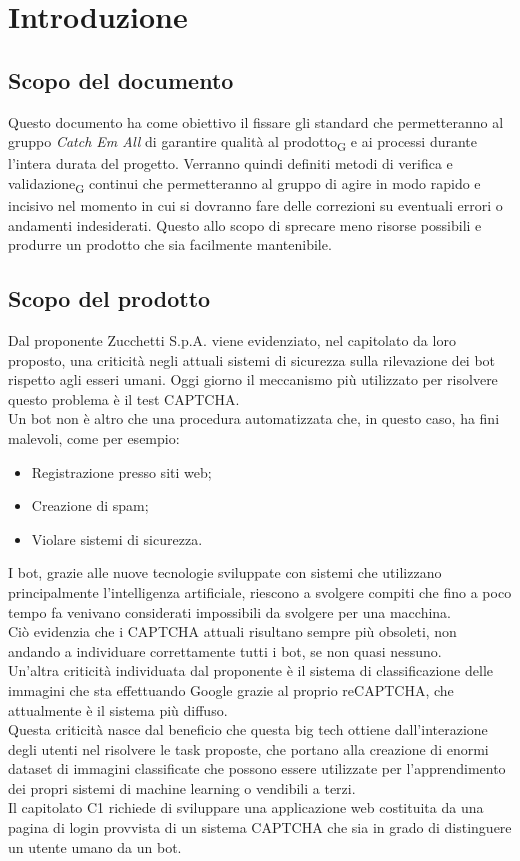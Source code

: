 \section{Introduzione}

\subsection{Scopo del documento}
Questo documento ha come obiettivo il fissare gli standard che permetteranno al gruppo \textit{Catch Em All} di garantire qualità al prodotto\textsubscript{G} e ai processi durante l'intera durata del progetto. Verranno quindi definiti metodi di verifica e validazione\textsubscript{G} continui che permetteranno al gruppo di agire in modo rapido e incisivo nel momento in cui si dovranno fare delle correzioni su eventuali errori o andamenti indesiderati. Questo allo scopo di sprecare meno risorse possibili e produrre un prodotto che sia facilmente mantenibile. 

\subsection{Scopo del prodotto}
Dal proponente Zucchetti S.p.A. viene evidenziato, nel capitolato da loro proposto, una criticità negli attuali sistemi di sicurezza sulla rilevazione dei bot rispetto agli esseri umani. Oggi giorno il meccanismo più utilizzato per risolvere questo problema è il test CAPTCHA.\\
Un bot non è altro che una procedura automatizzata che, in questo caso, ha fini malevoli, come per esempio:
\begin{itemize}
	\item Registrazione presso siti web;
	\item Creazione di spam;
	\item Violare sistemi di sicurezza.
\end{itemize}
I bot, grazie alle nuove tecnologie sviluppate con sistemi che utilizzano principalmente l'intelligenza artificiale, riescono a svolgere compiti che fino a poco tempo fa venivano considerati impossibili da svolgere per una macchina.\\
Ciò evidenzia che i CAPTCHA attuali risultano sempre più obsoleti, non andando a individuare correttamente tutti i bot, se non quasi nessuno.\\
Un'altra criticità individuata dal proponente è il sistema di classificazione delle immagini che sta effettuando Google grazie al proprio reCAPTCHA, che attualmente è il sistema più diffuso.\\
Questa criticità nasce dal beneficio che questa big tech ottiene dall'interazione degli utenti nel risolvere le task proposte, che portano alla creazione di enormi dataset di immagini classificate che possono essere utilizzate per l'apprendimento dei propri sistemi di machine learning o vendibili a terzi.\\
Il capitolato C1 richiede di sviluppare una applicazione web costituita da una pagina di login provvista di un sistema CAPTCHA che sia in grado di distinguere un utente umano da un bot.\\

